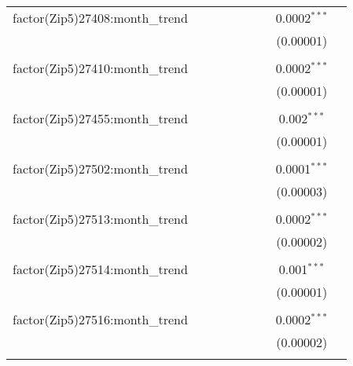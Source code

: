 \begin{table}[H]
{\begin{tabular}{@{\extracolsep{5pt}}lcccccccc}
  factor(Zip5)27408:month\_trend &  &  &  &  &  &  & 0.0002$^{***}$ &  \\  

   &  &  &  &  &  &  & (0.00001) &  \\  

   & & & & & & & & \\  

  factor(Zip5)27410:month\_trend &  &  &  &  &  &  & 0.0002$^{***}$ &  \\  

   &  &  &  &  &  &  & (0.00001) &  \\  

   & & & & & & & & \\  

  factor(Zip5)27455:month\_trend &  &  &  &  &  &  & 0.002$^{***}$ &  \\  

   &  &  &  &  &  &  & (0.00001) &  \\  

   & & & & & & & & \\  

  factor(Zip5)27502:month\_trend &  &  &  &  &  &  & 0.0001$^{***}$ &  \\  

   &  &  &  &  &  &  & (0.00003) &  \\  

   & & & & & & & & \\  

  factor(Zip5)27513:month\_trend &  &  &  &  &  &  & 0.0002$^{***}$ &  \\  

   &  &  &  &  &  &  & (0.00002) &  \\  

   & & & & & & & & \\  

  factor(Zip5)27514:month\_trend &  &  &  &  &  &  & 0.001$^{***}$ &  \\  

   &  &  &  &  &  &  & (0.00001) &  \\  

   & & & & & & & & \\  

  factor(Zip5)27516:month\_trend &  &  &  &  &  &  & 0.0002$^{***}$ &  \\  

   &  &  &  &  &  &  & (0.00002) &  \\  

   & & & & & & & & \\  


\end{tabular}}
\end{table}
